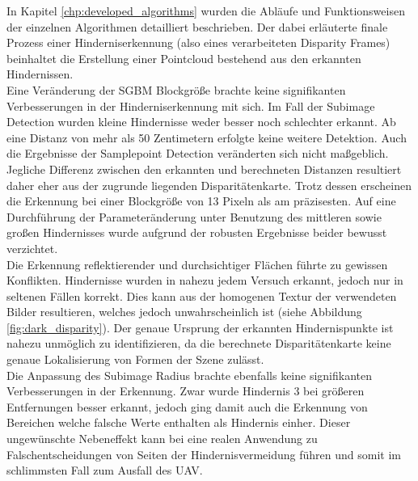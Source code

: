 \noindent
In Kapitel \ref{chp:developed_algorithms} wurden die Abläufe und Funktionsweisen der einzelnen Algorithmen detailliert beschrieben. Der dabei erläuterte finale Prozess einer Hinderniserkennung (also eines verarbeiteten Disparity Frames) beinhaltet die Erstellung einer Pointcloud bestehend aus den erkannten Hindernissen.\\

\noindent
Eine Veränderung der SGBM Blockgröße brachte keine signifikanten Verbesserungen in der Hinderniserkennung mit sich. Im Fall der Subimage Detection wurden kleine Hindernisse weder besser noch schlechter erkannt. Ab eine Distanz von mehr als 50 Zentimetern erfolgte keine weitere Detektion. Auch die Ergebnisse der Samplepoint Detection veränderten sich nicht maßgeblich. Jegliche Differenz zwischen den erkannten und berechneten Distanzen resultiert daher eher aus der zugrunde liegenden Disparitätenkarte. Trotz dessen erscheinen die Erkennung bei einer Blockgröße von 13 Pixeln als am präzisesten. Auf eine Durchführung der Parameteränderung unter Benutzung des mittleren sowie großen Hindernisses wurde aufgrund der robusten Ergebnisse beider bewusst verzichtet.\\

\noindent
Die Erkennung reflektierender und durchsichtiger Flächen führte zu gewissen Konflikten. Hindernisse wurden in nahezu jedem Versuch erkannt, jedoch nur in seltenen Fällen korrekt. Dies kann aus der homogenen Textur der verwendeten Bilder resultieren, welches jedoch unwahrscheinlich ist (siehe Abbildung \ref{fig:dark_disparity}). Der genaue Ursprung der erkannten Hindernispunkte ist nahezu unmöglich zu identifizieren, da die berechnete Disparitätenkarte keine genaue Lokalisierung von Formen der Szene zulässt.\\


\noindent
Die Anpassung des Subimage Radius brachte ebenfalls keine signifikanten Verbesserungen in der Erkennung. Zwar wurde Hindernis 3 bei größeren Entfernungen besser erkannt, jedoch ging damit auch die Erkennung von Bereichen welche falsche Werte enthalten als Hindernis einher. Dieser ungewünschte Nebeneffekt kann bei eine realen Anwendung zu Falschentscheidungen von Seiten der Hindernisvermeidung führen und somit im schlimmsten Fall zum Ausfall des UAV. 